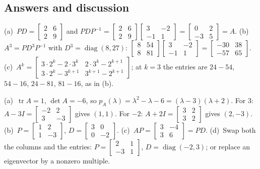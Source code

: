 \documentclass[11pt]{article}
\begin{document}
\subsection*{Answers and discussion}
\begin{description}[leftmargin=0pt,itemsep=5pt]
  \item[Knowledge Check \ref{kc:powersk}.] (a)~$PD=\begin{bmatrix}2&6\\2&9\end{bmatrix}$ and $PDP^{-1}=\begin{bmatrix}2&6\\2&9\end{bmatrix}\begin{bmatrix}3&-2\\-1&1\end{bmatrix}=\begin{bmatrix}0&2\\-3&5\end{bmatrix}=A$. (b)~$A^3=PD^3P^{-1}$ with $D^3=\operatorname{diag}(8,27)$: $\begin{bmatrix}8&54\\8&81\end{bmatrix}\begin{bmatrix}3&-2\\-1&1\end{bmatrix}=\begin{bmatrix}-30&38\\-57&65\end{bmatrix}$. (c)~$A^k=\begin{bmatrix}3\cdot2^k-2\cdot3^k&2\cdot3^k-2^{k+1}\\3\cdot2^k-3^{k+1}&3^{k+1}-2^{k+1}\end{bmatrix}$; at $k=3$ the entries are $24-54$, $54-16$, $24-81$, $81-16$, as in (b).
  \item[Knowledge Check \ref{kc:dok}.] (a)~$\operatorname{tr}A=1$, $\det A=-6$, so $p_A(\lambda)=\lambda^2-\lambda-6=(\lambda-3)(\lambda+2)$. For $3$: $A-3I=\begin{bmatrix}-2&2\\3&-3\end{bmatrix}$ gives $(1,1)$. For $-2$: $A+2I=\begin{bmatrix}3&2\\3&2\end{bmatrix}$ gives $(2,-3)$. (b)~$P=\begin{bmatrix}1&2\\1&-3\end{bmatrix}$, $D=\begin{bmatrix}3&0\\0&-2\end{bmatrix}$. (c)~$AP=\begin{bmatrix}3&-4\\3&6\end{bmatrix}=PD$. (d)~Swap both the columns and the entries: $P=\begin{bmatrix}2&1\\-3&1\end{bmatrix}$, $D=\operatorname{diag}(-2,3)$; or replace an eigenvector by a nonzero multiple.

\end{description}
\end{document}
